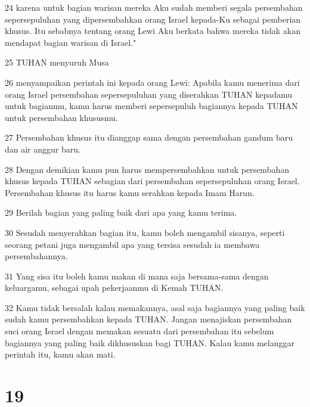 \par 24 karena untuk bagian warisan mereka Aku sudah memberi segala persembahan sepersepuluhan yang dipersembahkan orang Israel kepada-Ku sebagai pemberian khusus. Itu sebabnya tentang orang Lewi Aku berkata bahwa mereka tidak akan mendapat bagian warisan di Israel."
\par 25 TUHAN menyuruh Musa
\par 26 menyampaikan perintah ini kepada orang Lewi: Apabila kamu menerima dari orang Israel persembahan sepersepuluhan yang diserahkan TUHAN kepadamu untuk bagianmu, kamu harus memberi sepersepuluh bagiannya kepada TUHAN untuk persembahan khususmu.
\par 27 Persembahan khusus itu dianggap sama dengan persembahan gandum baru dan air anggur baru.
\par 28 Dengan demikian kamu pun harus mempersembahkan untuk persembahan khusus kepada TUHAN sebagian dari persembahan sepersepuluhan orang Israel. Persembahan khusus itu harus kamu serahkan kepada Imam Harun.
\par 29 Berilah bagian yang paling baik dari apa yang kamu terima.
\par 30 Sesudah menyerahkan bagian itu, kamu boleh mengambil sisanya, seperti seorang petani juga mengambil apa yang tersisa sesudah ia membawa persembahannya.
\par 31 Yang sisa itu boleh kamu makan di mana saja bersama-sama dengan keluargamu, sebagai upah pekerjaanmu di Kemah TUHAN.
\par 32 Kamu tidak bersalah kalau memakannya, asal saja bagiannya yang paling baik sudah kamu persembahkan kepada TUHAN. Jangan menajiskan persembahan suci orang Israel dengan memakan sesuatu dari persembahan itu sebelum bagiannya yang paling baik dikhususkan bagi TUHAN. Kalau kamu melanggar perintah itu, kamu akan mati.

\chapter{19}

